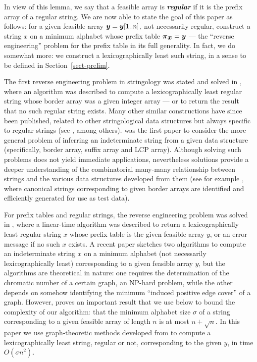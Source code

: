 \documentclass[runningheads,a4paper]{llncs}
\def\s#1{\mbox{\boldmath $#1$}}
\def\+{\!+\!}
\def\itbf#1{\textit{\textbf{#1}}}
\begin{document}
In view of this lemma, we say that a feasible array
is \itbf{regular} if it is the prefix array of a regular string.
We are now able to state the goal of this paper as follows:
for a given feasible array $\s{y} = \s{y}[1..n]$,
not necessarily regular,
construct a string \s{x} on a minimum alphabet
whose prefix table $\s{\pi}_{\s{x}} = \s{y}$ --- the ``reverse engineering''
problem for the prefix table in its full generality.
In fact, we do somewhat more: we construct a
lexicographically least such string,
in a sense to be defined in Section~\ref{sect-prelim}.

The first reverse engineering problem in stringology was stated and solved
in \cite{FLRS99,FGLR02}, where an algorithm was described
to compute a lexicographically least regular string whose border array was
a given integer array --- or to return the result that no such regular string exists.
Many other similar constructions have since been published,
related to other stringological data structures but always specific to
regular strings (see \cite{BIST03,DLL05,FS06,MNRR13}, among others).
\cite{NRR12} was the first paper to consider the more general problem
of inferring an indeterminate string from a given data structure
(specifically, border array, suffix array and LCP array).
Although solving such problems does not yield immediate applications,
nevertheless solutions provide a deeper understanding of the combinatorial many-many relationship between
strings and the various data structures developed from them
(see for example \cite{MSM99},
where canonical strings corresponding to given border arrays are identified
and efficiently generated for use as test data).

For prefix tables and regular strings,
the reverse engineering problem was solved in \cite{CCR09},
where a linear-time algorithm was described to return
a lexicographically least regular string \s{x} whose
prefix table is the given feasible array \s{y}, or an error message if no
such \s{x} exists.
A recent paper \cite{BBD14} sketches two algorithms
to compute an indeterminate string \s{x} on a minimum alphabet
(not necessarily lexicographically least) corresponding to
a given feasible array \s{y},
but the algorithms are theoretical in nature:
one requires the determination of the chromatic number of a certain graph,
an NP-hard problem,
while the other depends on somehow identifying the minimum
``induced positive edge cover'' of a graph.
However, \cite{BBD14} proves an important result that we use
below to bound the complexity of our algorithm:
that the minimum alphabet size $\sigma$ of a string corresponding
to a given feasible array of length $n$ is at most $n\+ \sqrt{n}$.
In this paper
we use graph-theoretic methods developed from \cite{CRSW13}
to compute a lexicographically least string,
regular or not, corresponding to the given \s{y},
in time $O(\sigma n^2)$.
\end{document}
